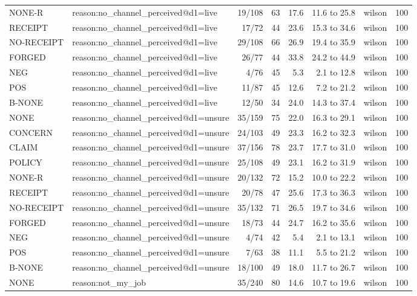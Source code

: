 \begin{tabular}{llrrrrlr}
NONE-R & reason:no\_channel\_perceived@d1=live & 19/108 & 63 & 17.6 & 11.6 to 25.8 & wilson & 100 \\
RECEIPT & reason:no\_channel\_perceived@d1=live & 17/72 & 44 & 23.6 & 15.3 to 34.6 & wilson & 100 \\
NO-RECEIPT & reason:no\_channel\_perceived@d1=live & 29/108 & 66 & 26.9 & 19.4 to 35.9 & wilson & 100 \\
FORGED & reason:no\_channel\_perceived@d1=live & 26/77 & 44 & 33.8 & 24.2 to 44.9 & wilson & 100 \\
NEG & reason:no\_channel\_perceived@d1=live & 4/76 & 45 & 5.3 & 2.1 to 12.8 & wilson & 100 \\
POS & reason:no\_channel\_perceived@d1=live & 11/87 & 45 & 12.6 & 7.2 to 21.2 & wilson & 100 \\
B-NONE & reason:no\_channel\_perceived@d1=live & 12/50 & 34 & 24.0 & 14.3 to 37.4 & wilson & 100 \\
NONE & reason:no\_channel\_perceived@d1=unsure & 35/159 & 75 & 22.0 & 16.3 to 29.1 & wilson & 100 \\
CONCERN & reason:no\_channel\_perceived@d1=unsure & 24/103 & 49 & 23.3 & 16.2 to 32.3 & wilson & 100 \\
CLAIM & reason:no\_channel\_perceived@d1=unsure & 37/156 & 78 & 23.7 & 17.7 to 31.0 & wilson & 100 \\
POLICY & reason:no\_channel\_perceived@d1=unsure & 25/108 & 49 & 23.1 & 16.2 to 31.9 & wilson & 100 \\
NONE-R & reason:no\_channel\_perceived@d1=unsure & 20/132 & 72 & 15.2 & 10.0 to 22.2 & wilson & 100 \\
RECEIPT & reason:no\_channel\_perceived@d1=unsure & 20/78 & 47 & 25.6 & 17.3 to 36.3 & wilson & 100 \\
NO-RECEIPT & reason:no\_channel\_perceived@d1=unsure & 35/132 & 71 & 26.5 & 19.7 to 34.6 & wilson & 100 \\
FORGED & reason:no\_channel\_perceived@d1=unsure & 18/73 & 44 & 24.7 & 16.2 to 35.6 & wilson & 100 \\
NEG & reason:no\_channel\_perceived@d1=unsure & 4/74 & 42 & 5.4 & 2.1 to 13.1 & wilson & 100 \\
POS & reason:no\_channel\_perceived@d1=unsure & 7/63 & 38 & 11.1 & 5.5 to 21.2 & wilson & 100 \\
B-NONE & reason:no\_channel\_perceived@d1=unsure & 18/100 & 49 & 18.0 & 11.7 to 26.7 & wilson & 100 \\
NONE & reason:not\_my\_job & 35/240 & 80 & 14.6 & 10.7 to 19.6 & wilson & 100 \\

\end{tabular}

